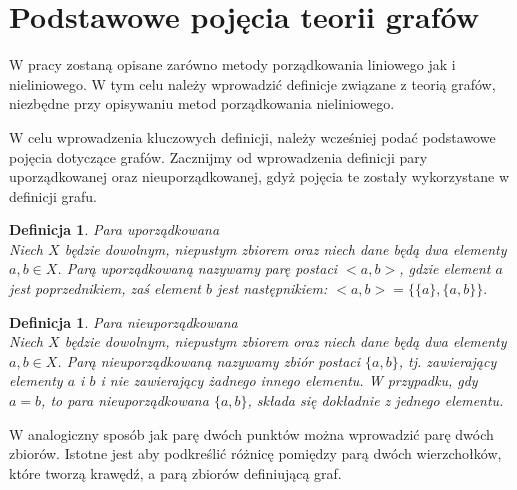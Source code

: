 \documentclass[12pt,a4paper]{report}
\newtheorem{definition}[theorem]{Definicja}
\begin{document}
\section{Podstawowe pojęcia teorii grafów}\label{grafy} %
W pracy zostaną opisane zarówno metody porządkowania liniowego jak i nieliniowego. W tym celu należy wprowadzić definicje związane z teorią grafów, niezbędne przy opisywaniu metod porządkowania nieliniowego.


W celu wprowadzenia kluczowych definicji, należy wcześniej podać podstawowe pojęcia dotyczące grafów. Zacznijmy od wprowadzenia definicji pary uporządkowanej oraz nieuporządkowanej, gdyż pojęcia te zostały wykorzystane w definicji grafu.



\begin{definition}{Para uporządkowana \cite[w oparciu o rozdział 3]{kuratowski2004}}\\
Niech $X$ będzie dowolnym, niepustym zbiorem oraz niech dane będą dwa elementy $a,b \in X$. Parą uporządkowaną nazywamy parę postaci $<a,b>$, gdzie element $a$ jest poprzednikiem, zaś element $b$ jest następnikiem: $<a,b>=\{\{a\},\{a,b\}\}.$
\end{definition}

\begin{definition}{Para nieuporządkowana \cite[w oparciu o rozdział 3]{kuratowski2004}}\\
Niech $X$ będzie dowolnym, niepustym zbiorem oraz niech dane będą dwa elementy $a,b \in X$. Parą nieuporządkowaną nazywamy zbiór postaci $\{a,b\}$, tj. zawierający elementy $a$ i $b$ i nie zawierający żadnego innego elementu. W przypadku, gdy $a=b$, to para nieuporządkowana $\{a,b\}$, składa się dokładnie z jednego elementu.
\end{definition}

W analogiczny sposób jak parę dwóch punktów można wprowadzić parę dwóch zbiorów. Istotne jest aby podkreślić różnicę pomiędzy parą dwóch wierzchołków, które tworzą krawędź, a parą zbiorów definiującą graf. 
\end{document}
